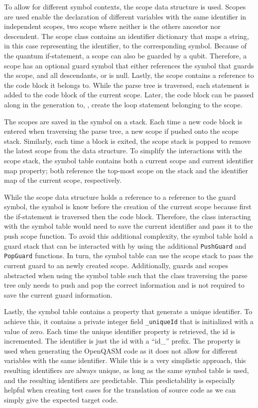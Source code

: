 To allow for different symbol contexts, the scope data structure is used. Scopes are used enable the declaration of different variables with the same identifier in independent scopes, \ie two scope where neither is the others ancestor nor descendent. The scope class contains an identifier dictionary that maps a string, in this case representing the identifier, to the corresponding symbol. Because of the quantum if-statement, a scope can also be guarded by a qubit. Therefore, a scope has an optional guard symbol that either references the symbol that guards the scope, and all descendants, or is null. Lastly, the scope contains a reference to the code block it belongs to. While the parse tree is traversed, each statement is added to the code block of the current scope. Later, the code block can be passed along in the generation to, \eg, create the loop statement belonging to the scope. 

The scopes are saved in the symbol on a stack. Each time a new code block is entered when traversing the parse tree, a new scope if pushed onto the scope stack. Similarly, each time a block is exited, the scope stack is popped to remove the latest scope from the data structure. To simplify the interactions with the scope stack, the symbol table contains both a current scope and current identifier map property; both reference the top-most scope on the stack and the identifier map of the current scope, respectively.

While the scope data structure holds a reference to a reference to the guard symbol, the symbol is know before the creation of the current scope because first the if-statement is traversed then the code block. Therefore, the class interacting with the symbol table would need to save the current identifier and pass it to the push scope function. To avoid this additional complexity, the symbol table hold a guard stack that can be interacted with by using the additional \texttt{PushGuard} and \texttt{PopGuard} functions. In turn, the symbol table can use the scope stack to pass the current guard to an newly created scope. Additionally, guards and scopes abstracted when using the symbol table such that the class traversing the parse tree only needs to push and pop the correct information and is not required to save the current guard information. 

Lastly, the symbol table contains a property that generate a unique identifier. To achieve this, it contains a private integer field \texttt{\_uniqueId} that is initialized with a value of zero. Each time the unique identifier property is retrieved, the id is incremented. The identifier is just the id with a ``id\_'' prefix. The property is used when generating the OpenQASM code as it does not allow for different variables with the same identifier. While this is a very simplistic approach, this resulting identifiers are always unique, as long as the same symbol table is used, and the resulting identifiers are predictable. This predictability is especially helpful when creating test cases for the translation of source code as we can simply give the expected target code. 

